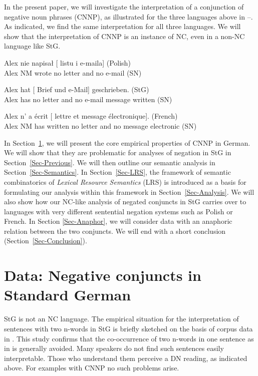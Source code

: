 \documentclass[output=paper]{langsci/langscibook}
\begin{document}
In the present paper, we will investigate the interpretation of a conjunction of negative noun phrases (CNNP), as illustrated for the three languages above in --. 
As indicated, we find the same interpretation for all three languages. 
We will show that the interpretation of CNNP is an instance of NC, even in a non-NC language like StG. 


\ea \label{ex-conj-pl}
\gll Alex nie napisał [ listu
i  e-maila]
(Polish)\\
Alex NM wrote \hphantom{[}no letter and \hphantom{[}no e-mail (SN)\\
\glt {}
\z 

\ea \label{ex-conj-de}
\gll Alex hat [ Brief und  e-Mail] geschrieben. (StG)\\
Alex has \hphantom{[}no letter and \hphantom{[}no {e-mail message} written (SN)\\
\z

\ea \label{ex-conj-fr}
\gll Alex n' a écrit [ lettre et  message électronique]. (French)\\
Alex NM has written \hphantom{[}no letter and \hphantom{[}no message electronic (SN)\\
\z 



In Section~\ref{Sec-Data}, we will present the core empirical properties of CNNP in German. We will show that they are problematic for analyses of negation in StG in Section~\ref{Sec-Previous}. We will then
outline our semantic analysis in Section~\ref{Sec-Semantics}. In Section~\ref{Sec-LRS}, the framework of semantic combinatorics of \emph{Lexical Resource Semantics} (LRS) is introduced as a basis for formulating our analysis within this framework in Section~\ref{Sec-Analysis}. 
We will also show how our NC-like analysis of negated conjuncts in StG carries over to languages with very different sentential negation systems such as Polish or French.
In Section \ref{Sec-Anaphor}, we will consider data with an anaphoric relation between the two conjuncts.
We will end with a short conclusion (Section~\ref{Sec-Conclusion}).

\section{Data: Negative conjuncts in Standard German}
\label{Sec-Data}

StG is not an NC language. 
The empirical situation for the interpretation of sentences with two n-words in StG is briefly sketched on the basis of corpus data in \cite[242--245]{Sailer:18}.
This study confirms that the co-occurrence of two n-words in one sentence as in  is generally avoided. %
Many speakers do not find such sentences easily interpretable. 
Those who understand them perceive a DN reading, as indicated above.
For examples with CNNP no such problems arise.
\end{document}
